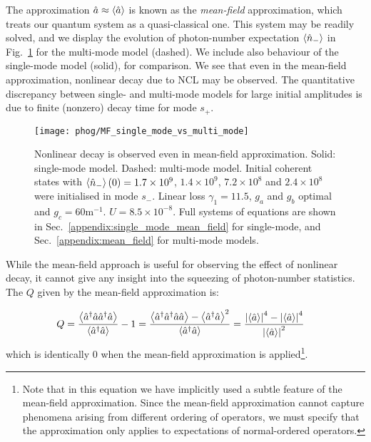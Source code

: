 The approximation $\hat{a} \approx \ev{\hat{a}}$ is known as the \emph{mean-field} approximation, which treats our quantum system as a quasi-classical one. This system may be readily solved, and we display the evolution of photon-number expectation $\ev{\hat{n}_-}$ in Fig.~\ref{fig:phog_MF_demonstration} for the multi-mode model (dashed). We include also behaviour of the single-mode model (solid), for comparison. We see that even in the mean-field approximation, nonlinear decay due to NCL may be observed. The quantitative discrepancy between single- and multi-mode models for large initial amplitudes is due to finite (nonzero) decay time for mode $s_+$.


\begin{figure}[htp]
\centering
\texttt{[image: phog/MF\_single\_mode\_vs\_multi\_mode]}
\caption{\label{fig:phog_MF_demonstration} Nonlinear decay is observed even in mean-field approximation. Solid: single-mode model. Dashed: multi-mode model. Initial coherent states with $\ev{\hat{n}_-}\left(0\right) = 1.7\times 10^9$, $1.4\times10^9$, $7.2\times10^8$ and $2.4\times10^8$ were initialised in mode $s_-$. Linear loss $\gamma_1 = 11.5$, $g_a$ and $g_b$ optimal and $g_c = 60$m$^{-1}$. $U = 8.5\times10^{-8}$. Full systems of equations are shown in Sec.~\ref{appendix:single_mode_mean_field} for single-mode, and Sec.~\ref{appendix:mean_field} for multi-mode models.}
\end{figure}


While the mean-field approach is useful for observing the effect of nonlinear decay, it cannot give any insight into the squeezing of photon-number statistics. The $Q$ given by the mean-field approximation is:

\begin{align}
Q = \frac{\ev{\hat{a}^\dagger \hat{a} \hat{a}^\dagger \hat{a}}}{\ev{\hat{a}^\dagger \hat{a}}} - 1 &= \frac{\ev{\hat{a}^\dagger \hat{a}^\dagger \hat{a} \hat{a}} - \ev{\hat{a}^\dagger \hat{a}}^2}{\ev{\hat{a}^\dagger \hat{a}}} = \frac{\left|\ev{\hat{a}}\right|^4 - \left|\ev{\hat{a}}\right|^4}{\left|\ev{\hat{a}}\right|^2} \notag
\end{align}
which is identically $0$ when the mean-field approximation is applied\footnote{Note that in this equation we have implicitly used a subtle feature of the mean-field approximation. Since the mean-field approximation cannot capture phenomena arising from different ordering of operators, we must specify that the approximation only applies to expectations of normal-ordered operators.}.

